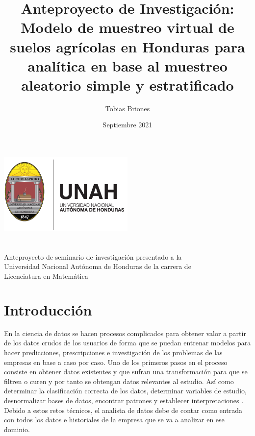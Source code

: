 \documentclass{report}
\title{Anteproyecto de Investigación: Modelo de muestreo virtual de suelos agrícolas en Honduras para analítica en base al muestreo aleatorio simple y estratificado}
\author{Tobias Briones}
\date{Septiembre 2021}
\begin{document}
\makeatletter
    \begin{titlepage}
        \begin{center}
            \includegraphics[width=0.3\linewidth]{ref/logo-unah.png}\\[4ex]
            {\huge \bfseries \@title 
            \vspace{1cm}}\\[2ex]
            {\LARGE \@author}\\[50ex] 
            
            {\large
            Anteproyecto de seminario de investigación presentado a la\\
            Universidad Nacional Autónoma de Honduras de la carrera de\\
            Licenciatura en Matemática
            }\\[2ex]
            
            {\large \@date}
        \end{center}
    \end{titlepage}
\makeatother
\thispagestyle{empty}
\newpage

\thispagestyle{empty}
\tableofcontents
\listoffigures
\newpage

\chapter{Introducción}

En la ciencia de datos se hacen procesos complicados para obtener valor a partir de los datos crudos de los usuarios de forma que se puedan entrenar modelos para hacer predicciones, prescripciones e investigación de los problemas de las empresas en base a caso por caso. Uno de los primeros pasos en el proceso consiste en obtener datos existentes y que sufran una transformación para que se filtren o curen y por tanto se obtengan datos relevantes al estudio. Así como determinar la clasificación correcta de los datos, determinar variables de estudio, desnormalizar bases de datos, encontrar patrones y establecer  interpretaciones \cite{university-of-wisconsin-data-science-2021}. Debido a estos retos técnicos, el analista de datos debe de contar como entrada con todos los datos e historiales de la empresa que se va a analizar en ese dominio.
\end{document}
